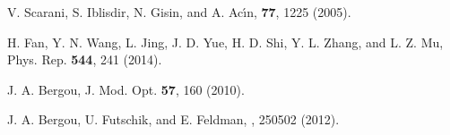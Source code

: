 \documentclass[aps,prl,twocolumn,showpacs]{revtex4}
\begin{document}
\begin{thebibliography}{99}
 V. Scarani, S. Iblisdir, N. Gisin, and A. Ac\'{\i}n, \rmp \textbf{77}, 1225 (2005).

 H. Fan, Y. N. Wang, L. Jing, J. D. Yue, H. D. Shi, Y. L. Zhang, and L. Z. Mu, Phys. Rep. {\bf 544}, 241 (2014).

 J. A. Bergou, J. Mod. Opt. {\bf 57}, 160 (2010).

 J. A. Bergou, U. Futschik, and E. Feldman, , 250502 (2012).


\end{thebibliography}     
\end{document}
